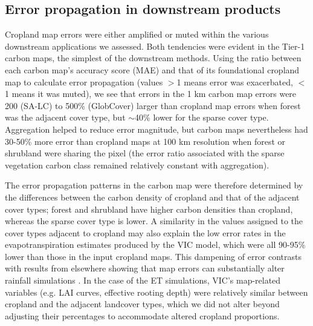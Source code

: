 \documentclass[12 pt, titlepage, a4paper]{article}
\begin{document}
\vspace{-0.3 cm}
\subsection*{Error propagation in downstream products}
\vspace{-0.2 cm}
Cropland map errors were either amplified or muted within the various downstream applications we assessed. Both tendencies were evident in the Tier-1 carbon maps, the simplest of the downstream methods. Using the ratio between each carbon map's accuracy score (MAE) and that of its foundational cropland map to calculate error propagation (values $>$1 means error was exacerbated, $<$1 means it was muted), we see that errors in the 1 km carbon map errors were 200 (SA-LC) to 500\% (GlobCover) larger than cropland map errors when forest was the adjacent cover type, but $\sim$40\% lower for the sparse cover type.  Aggregation helped to reduce error magnitude, but carbon maps nevertheless had 30-50\% more error than cropland maps at 100 km resolution when forest or shrubland were sharing the pixel (the error ratio associated with the sparse vegetation carbon class remained relatively constant with aggregation).  

The error propagation patterns in the carbon map were therefore determined by the differences between the carbon density of cropland and that of the adjacent cover types; forest and shrubland have higher carbon densities than cropland, whereas the sparse cover type is lower. A similarity in the values assigned to the cover types adjacent to cropland may also explain the low error rates in the evapotranspiration estimates produced by the VIC model, which were all 90-95\% lower than those in the input cropland maps. This dampening of error contrasts with results from elsewhere showing that map errors can substantially alter rainfall simulations \citep{ge_impacts_2007}. In the case of the ET simulations, VIC's map-related variables (e.g. LAI curves, effective rooting depth) were relatively similar between cropland and the adjacent landcover types, which we did not alter beyond adjusting their percentages to accommodate altered cropland proportions. 
\end{document}

